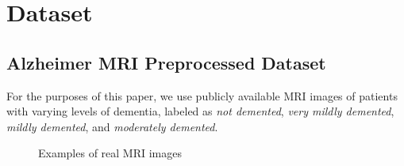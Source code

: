 \documentclass [MAS] {uclathes}
\begin{document}
\chapter{Dataset}

\section{Alzheimer MRI Preprocessed Dataset}
For the purposes of this paper, we use publicly available MRI images of patients with varying levels of dementia, 
labeled as \textit{not demented}, \textit{very mildly demented}, \textit{mildly demented}, and \textit{moderately 
demented}.

\begin{figure}[H]
    \centering
    \hfill
    \hfill
    \hfill
    \caption{Examples of real MRI images}
\end{figure}
\end{document}
